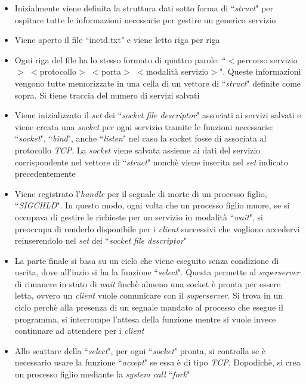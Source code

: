 \documentclass[a4paper, 12pt]{report}
\begin{document}
\begin{itemize}
    \item Inizialmente viene definita la struttura dati sotto forma di ``\textit{struct}" per ospitare tutte le informazioni necessarie per gestire un generico servizio
    \item Viene aperto il file ``inetd.txt" e viene letto riga per riga
    \item Ogni riga del file ha lo stesso formato di quattro parole: ``$<$percorso servizio$>$ $<$protocollo$>$ $<$porta$>$ $<$modalità servizio$>$". Queste informazioni vengono tutte
    memorizzate in una cella di un vettore di ``\textit{struct}" definite come sopra. Si tiene traccia del numero di servizi salvati
    \item Viene inizializzato il \textit{set} dei ``\textit{socket file descriptor}" associati ai servizi salvati e viene creata una \textit{socket} per ogni servizio tramite le
    funzioni necessarie: ``\textit{socket}", ``\textit{bind}", anche ``\textit{listen}" nel caso la socket fosse di associata al protocollo \textit{TCP}. La \textit{socket}
    viene salvata assieme ai dati del servizio corrispondente nel vettore di ``\textit{struct}" nonchè viene inserita nel \textit{set} indicato precedentemente
    \item Viene registrato l'\textit{handle} per il segnale di morte di un processo figlio, ``\textit{SIGCHLD}". In questo modo, ogni volta che un processo figlio muore,
    se si occupava di gestire le richieste per un servizio in modalità ``\textit{wait}", si preoccupa di renderlo disponibile per i \textit{client} successivi che vogliono
    accedervi reinserendolo nel \textit{set} dei ``\textit{socket file descriptor}"
    \item La parte finale si basa su un ciclo che viene eseguito senza condizione di uscita, dove all'inzio si ha la funzione ``\textit{select}". Questa permette al
    \textit{superserver} di rimanere in stato di \textit{wait} finchè almeno una socket è pronta per essere letta, ovvero un \textit{client} vuole comunicare con il
    \textit{superserver}. Si trova in un ciclo perchè alla presenza di un segnale mandato al processo che esegue il programma, si interrompe l'attesa della funzione mentre
    si vuole invece continuare ad attendere per i \textit{client}
    \item Allo scattare della ``\textit{select}", per ogni ``\textit{socket}" pronta, si controlla se è necessario usare la funzione ``\textit{accept}" se essa è di tipo
    \textit{TCP}. Dopodichè, si crea un processo figlio mediante la \textit{system call} ``\textit{fork}"

\end{itemize}
\end{document}
